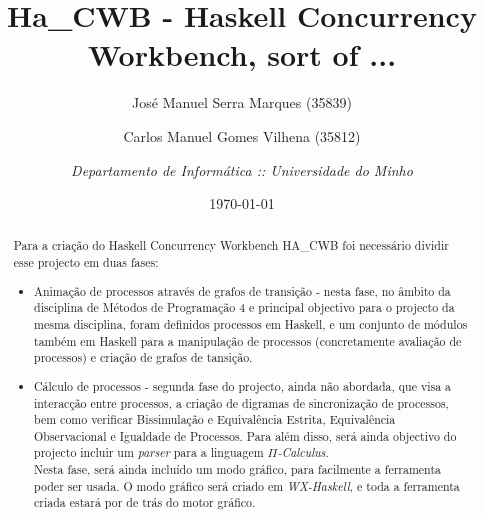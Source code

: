 \documentclass[a4paper,11pt]{article}
\begin{document}

\title{Ha\_CWB - Haskell Concurrency Workbench, sort of ...}
\author{José Manuel Serra Marques (35839) \and Carlos Manuel Gomes Vilhena (35812)\and \emph{Departamento de Informática :: Universidade do Minho}}
\date{\today}
\maketitle

%
\begin{abstract}
Para a criação do Haskell Concurrency Workbench HA\_CWB foi necessário dividir esse projecto em duas fases: \\

\begin{itemize}
\item Animação de processos através de grafos de transição - nesta fase, no âmbito da disciplina de Métodos de Programação 4 e principal 
objectivo para o projecto da mesma disciplina, foram definidos processos em Haskell, e um conjunto de módulos também em Haskell para a 
manipulação de processos (concretamente avaliação de processos) e criação de grafos de tansição.
\item Cálculo de processos - segunda fase do projecto, ainda não abordada, que visa a interacção entre processos, a criação de digramas de 
sincronização de processos, bem como verificar Bissimulação e Equivalência Estrita, Equivalência Observacional e Igualdade de Processos. Para 
além disso, será ainda objectivo do projecto incluir um \textit{parser} para a linguagem \textit{$\Pi$-Calculus}. \\
Nesta fase, será ainda incluído um modo gráfico, para facilmente a ferramenta poder ser usada. O modo gráfico será criado em \textit{WX-Haskell}, 
e toda a ferramenta criada estará por de trás do motor gráfico.
\end{itemize}

\end{abstract}

\newpage

\tableofcontents



	









\end{document}
